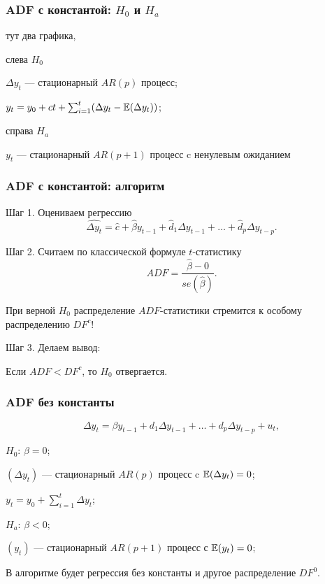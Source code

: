 \begin{frame}
  \frametitle{ADF с константой: $H_0$ и $H_a$}


  тут два графика,


  слева $H_0$

  $\Delta y_t$ — стационарный $AR(p)$ процесс;

  $y_t = y_0 + ct + \sum_{i=1}^t (\Delta y_t - \mathbb{E}(\Delta y_t))$;


  справа $H_a$

  $y_t$ — стационарный $AR(p + 1)$ процесс c ненулевым ожиданием

\end{frame}

\begin{frame}
  \frametitle{ADF с константой: алгоритм}

  Шаг 1. Оцениваем \alert{регрессию}
  \[
    \widehat{\Delta y_t} = \hat c + \hat \beta y_{t-1} + \hat d_1 \Delta y_{t-1} + \ldots + \hat d_p \Delta y_{t-p}.  
  \]

  \pause
  Шаг 2. Считаем по \alert{классической формуле} $t$-статистику
  \[
  ADF = \frac{\hat \beta -  0}{se(\hat \beta)}.  
  \]

  \pause
  При верной $H_0$ распределение $ADF$-статистики стремится к \alert{особому распределению} $DF^c$!

  \pause 
  Шаг 3. Делаем вывод:
  
  Если $ADF < DF^c$, то $H_0$ отвергается. 

\end{frame}


\begin{frame}
  \frametitle{ADF без константы}
  \[
  \Delta y_t = \beta y_{t-1} + d_1 \Delta y_{t-1} + \ldots + d_p \Delta y_{t-p} + u_t,  
  \]

  \pause

  \alert{$H_0$: $\beta = 0$};
  
  $(\Delta y_t)$ — стационарный $AR(p)$ процесс c $\mathbb{E}(\Delta y_t) = 0$;

  $y_t = y_0 + \sum_{i=1}^t \Delta y_t $;

  \pause

  \alert{$H_a$: $\beta < 0$};

  $(y_t)$ — стационарный $AR(p + 1)$ процесс с $\mathbb{E}(y_t) = 0$;

  \pause 

  В алгоритме будет \alert{регрессия без константы} и другое распределение $DF^0$.

\end{frame}


